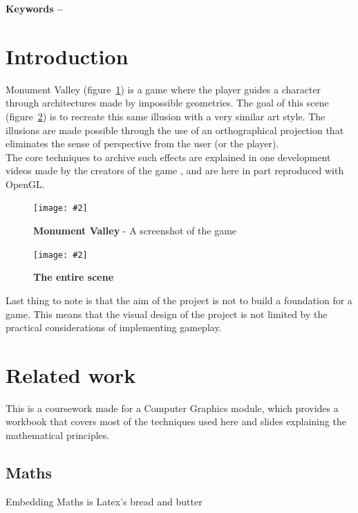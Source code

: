 \documentclass[10pt, a4paper]{article}
\title{\mytitle}
\author{\myauthor\hspace{1em}\\\contact\\Edinburgh Napier University\hspace{0.5em}-\hspace{0.5em}\mymodule}
\date{}
\newcommand{\figuremacro}[5]{
    \begin{figure}[#1]
        \centering
        \texttt{[image: \#2]}
        \caption[#3]{\textbf{#3}#4}
        \label{fig:#2}
    \end{figure}
}
\begin{document}
	\maketitle
	\begin{abstract}
		This computer graphics project aims to show a scene that replicates the art style used in the game \textit{Monument Valley} by using OpenGL. The main characteristic of the game -- and this project -- is the clever use of the clever use of a camera with an orthographical projection that allows to create impossible geometries.
	\end{abstract}
    
	\textbf{Keywords -- }{\mykeywords}
	\section{Introduction}
	Monument Valley (figure~\ref{fig:MV1}) is a game where the player guides a character through architectures made by impossible geometries. The goal of this scene (figure~\ref{fig:Capture01}) is to recreate this same illusion with a very similar art style. The illusions are made possible through the use of an orthographical projection that eliminates the sense of perspective from the user (or the player). \\ The core techniques to archive such effects are explained in one development videos made by the creators of the game \cite{Video1}, and are here in part reproduced with OpenGL.	\\
	\figuremacro{h}{MV1}{Monument Valley}{ - A screenshot of the game}{1.0}	
	\figuremacro{h}{Capture01}{The entire scene}{}{1.0}
	Last thing to note is that the aim of the project is not to build a foundation for a game. This means that the visual design of the project is not limited by the practical considerations of implementing gameplay.
	
	\section{Related work}
	This is a coursework made for a Computer Graphics module, which provides a workbook that covers most of the techniques used here and slides explaining the mathematical principles.
    
	\subsection{Maths}
    Embedding Maths is Latex's bread and butter    
    
\end{document}
